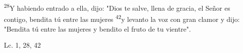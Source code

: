 \documentclass[../../rosario.tex]{subfiles}
\begin{document}
    \textsuperscript{28}Y habiendo entrado a ella, dijo: "Dios te salve, llena de gracia, el Señor es contigo, bendita tú entre las mujeres 
    \textsuperscript{42}y levanto la voz con gran clamor y dijo: "Bendita tú entre las mujeres y bendito el fruto de tu vientre".
    \begin{flushright}
    Lc. 1, 28, 42
    \end{flushright}
\end{document}

